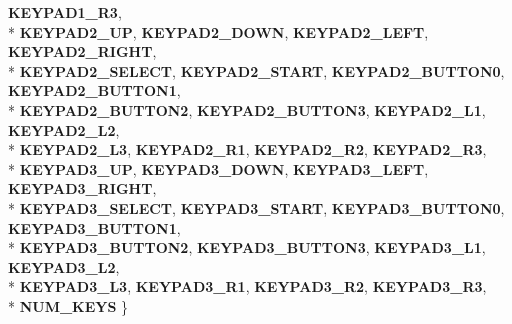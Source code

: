 \begin{DoxyCompactItemize}
{\bfseries K\+E\+Y\+P\+A\+D1\+\_\+\+R3}, 
\\*
{\bfseries K\+E\+Y\+P\+A\+D2\+\_\+\+UP}, 
{\bfseries K\+E\+Y\+P\+A\+D2\+\_\+\+D\+O\+WN}, 
{\bfseries K\+E\+Y\+P\+A\+D2\+\_\+\+L\+E\+FT}, 
{\bfseries K\+E\+Y\+P\+A\+D2\+\_\+\+R\+I\+G\+HT}, 
\\*
{\bfseries K\+E\+Y\+P\+A\+D2\+\_\+\+S\+E\+L\+E\+CT}, 
{\bfseries K\+E\+Y\+P\+A\+D2\+\_\+\+S\+T\+A\+RT}, 
{\bfseries K\+E\+Y\+P\+A\+D2\+\_\+\+B\+U\+T\+T\+O\+N0}, 
{\bfseries K\+E\+Y\+P\+A\+D2\+\_\+\+B\+U\+T\+T\+O\+N1}, 
\\*
{\bfseries K\+E\+Y\+P\+A\+D2\+\_\+\+B\+U\+T\+T\+O\+N2}, 
{\bfseries K\+E\+Y\+P\+A\+D2\+\_\+\+B\+U\+T\+T\+O\+N3}, 
{\bfseries K\+E\+Y\+P\+A\+D2\+\_\+\+L1}, 
{\bfseries K\+E\+Y\+P\+A\+D2\+\_\+\+L2}, 
\\*
{\bfseries K\+E\+Y\+P\+A\+D2\+\_\+\+L3}, 
{\bfseries K\+E\+Y\+P\+A\+D2\+\_\+\+R1}, 
{\bfseries K\+E\+Y\+P\+A\+D2\+\_\+\+R2}, 
{\bfseries K\+E\+Y\+P\+A\+D2\+\_\+\+R3}, 
\\*
{\bfseries K\+E\+Y\+P\+A\+D3\+\_\+\+UP}, 
{\bfseries K\+E\+Y\+P\+A\+D3\+\_\+\+D\+O\+WN}, 
{\bfseries K\+E\+Y\+P\+A\+D3\+\_\+\+L\+E\+FT}, 
{\bfseries K\+E\+Y\+P\+A\+D3\+\_\+\+R\+I\+G\+HT}, 
\\*
{\bfseries K\+E\+Y\+P\+A\+D3\+\_\+\+S\+E\+L\+E\+CT}, 
{\bfseries K\+E\+Y\+P\+A\+D3\+\_\+\+S\+T\+A\+RT}, 
{\bfseries K\+E\+Y\+P\+A\+D3\+\_\+\+B\+U\+T\+T\+O\+N0}, 
{\bfseries K\+E\+Y\+P\+A\+D3\+\_\+\+B\+U\+T\+T\+O\+N1}, 
\\*
{\bfseries K\+E\+Y\+P\+A\+D3\+\_\+\+B\+U\+T\+T\+O\+N2}, 
{\bfseries K\+E\+Y\+P\+A\+D3\+\_\+\+B\+U\+T\+T\+O\+N3}, 
{\bfseries K\+E\+Y\+P\+A\+D3\+\_\+\+L1}, 
{\bfseries K\+E\+Y\+P\+A\+D3\+\_\+\+L2}, 
\\*
{\bfseries K\+E\+Y\+P\+A\+D3\+\_\+\+L3}, 
{\bfseries K\+E\+Y\+P\+A\+D3\+\_\+\+R1}, 
{\bfseries K\+E\+Y\+P\+A\+D3\+\_\+\+R2}, 
{\bfseries K\+E\+Y\+P\+A\+D3\+\_\+\+R3}, 
\\*
{\bfseries N\+U\+M\+\_\+\+K\+E\+YS}
 \}\hypertarget{class_i_dream_sky_1_1_input_a6fb84ef1e6776707a3e3a6abe7c15ac3}{}\label{class_i_dream_sky_1_1_input_a6fb84ef1e6776707a3e3a6abe7c15ac3}

\end{DoxyCompactItemize}
